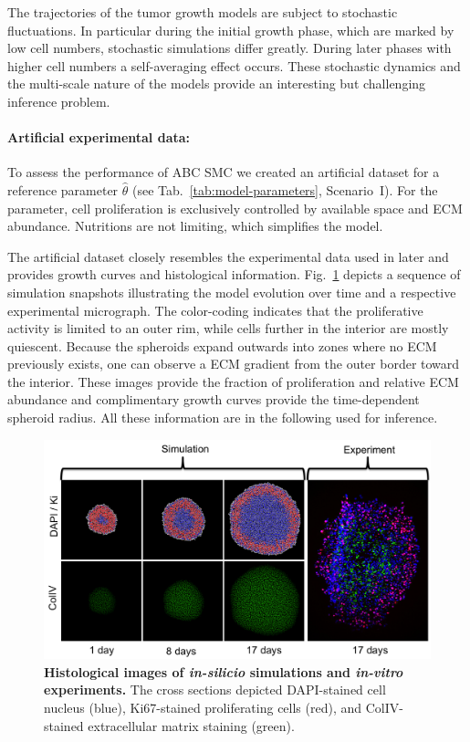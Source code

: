 \documentclass[10pt,letterpaper]{article}
\begin{document}
The trajectories of the tumor growth models are subject to stochastic fluctuations. In particular during the initial growth phase, which are marked by low cell numbers, stochastic simulations differ greatly. During later phases with higher cell numbers a self-averaging effect occurs. These stochastic dynamics and the multi-scale nature of the models provide an interesting but challenging inference problem.

\paragraph{Artificial experimental data:}
To assess the performance of ABC SMC we created an artificial dataset for a reference parameter $\hat{\theta}$ (see Tab.~\ref{tab:model-parameters}, Scenario~I). For the parameter, cell proliferation is exclusively controlled by available space and ECM abundance. Nutritions are not limiting, which simplifies the model.

The artificial dataset closely resembles the experimental data used in later and provides growth curves and histological information. Fig.~\ref{fig2} depicts a sequence of simulation snapshots illustrating the model evolution over time and a respective experimental micrograph. The color-coding indicates that the proliferative activity is limited to an outer rim, while cells further in the interior are mostly quiescent. Because the spheroids expand outwards into zones where no ECM previously exists, one can observe a ECM gradient from the outer border toward the interior. These images provide the fraction of proliferation and relative ECM abundance and complimentary growth curves provide the time-dependent spheroid radius. All these information are in the following used for inference.

\begin{figure}[!t]
\includegraphics[width=\textwidth]{Figures/SimulationSnapshots}
\caption{{\bf Histological images of \textit{in-silicio} simulations and \textit{in-vitro} experiments.}
The cross sections depicted DAPI-stained cell nucleus (blue), Ki67-stained proliferating cells (red), and ColIV-stained extracellular matrix staining (green).}
\label{fig2}
\end{figure}
\end{document}
